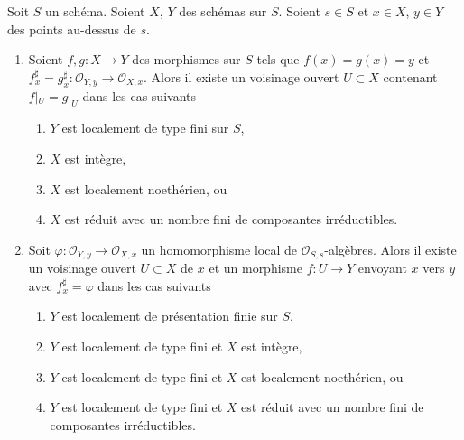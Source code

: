\begin{lemma}
\label{lemma-morphism-defined-local-ring}
Soit $S$ un schéma. Soient $X$, $Y$ des schémas sur $S$.
Soient $s \in S$ et $x \in X$, $y \in Y$ des points au-dessus de $s$.
\begin{enumerate}
\item Soient $f, g : X \to Y$ des morphismes sur $S$
tels que
$f(x) = g(x) = y$ et $f^\sharp_x = g^\sharp_x : \mathcal{O}_{Y, y} \to \mathcal{O}_{X, x}$. Alors il existe un voisinage
ouvert $U \subset X$ contenant $f|_U = g|_U$
dans les cas suivants
\begin{enumerate}
\item $Y$ est localement de type fini sur $S$,
\item $X$ est intègre,
\item $X$ est localement noethérien, ou
\item $X$ est réduit avec un nombre fini de composantes irréductibles.
\end{enumerate}
\item Soit $\varphi : \mathcal{O}_{Y, y} \to \mathcal{O}_{X, x}$ un homomorphisme local
de $\mathcal{O}_{S, s}$-algèbres. Alors il existe un voisinage ouvert $U \subset X$
de $x$ et un morphisme $f : U \to Y$ envoyant $x$
vers $y$ avec $f^\sharp_x = \varphi$ dans les cas suivants
\begin{enumerate}
\item $Y$ est localement de présentation finie sur $S$,
\item $Y$ est localement de type fini et $X$ est intègre,
\item $Y$ est localement de type fini et $X$ est localement noethérien, ou
\item $Y$ est localement de type fini et $X$ est réduit avec un nombre
fini de composantes irréductibles.
\end{enumerate}
\end{enumerate}
\end{lemma}

